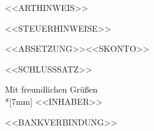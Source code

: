 \documentclass[11pt,a4paper]{article}
\newcommand{\hinweisabsatz}[1]{\par\vspace{6mm}\noindent%
  {\interlinepenalty=10000 \nonfrenchspacing\sfcode`\:=1000 \sfcode`\;=1000 \sfcode`\,=1000 #1\par}}
\newcommand{\absetzungskopf}[1]{\par\vspace{6mm}\noindent #1\par\vspace{1.5mm}}
\newcommand{\bankblock}{\vspace{9mm}\noindent{\bfseries Bankverbindung}\\[1.5mm]%
  Kontoinhaber: <<KONTOINHABER>>\\
  Institut: <<INSTITUT>>\\
  IBAN: <<IBAN>>\\
  BIC: <<BIC>>}
\begin{document}
<<ARTHINWEIS>>

\vspace{6mm}

<<STEUERHINWEISE>>

<<ABSETZUNG>><<SKONTO>>

\vspace{5mm}

{ <<SCHLUSSSATZ>>\par}
\nopagebreak
\vspace{5mm}

Mit freundlichen Grüßen\\*[7mm]
<<INHABER>>

<<BANKVERBINDUNG>>
\end{document}
